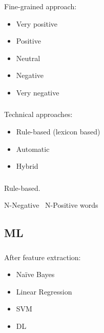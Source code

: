 \documentclass[t, 11pt]{beamer}
\begin{document}
\begin{frame}
	\frametitle{\insertsection}
	\frametitle{\insertsubsection}  
	Fine-grained approach: 
	\begin{itemize}
	\item Very positive
	\item Positive
	\item Neutral
	\item Negative
	\item Very negative
\end{itemize}
\end{frame}



\begin{frame}
	\frametitle{\insertsection}
	\frametitle{\insertsubsection}  
	Technical approaches:
\begin{itemize}
	\item Rule-based (lexicon based)
	\item Automatic
	\item Hybrid
	\end{itemize}
\end{frame}

\begin{frame}
	\frametitle{\insertsection}
	\frametitle{\insertsubsection}  
	Rule-based.
	
	N-Negative \ N-Positive words
	
\end{frame}



\subsection{ML}
\begin{frame}
	\frametitle{\insertsection}
	\frametitle{\insertsubsection}  
	After feature extraction: 
	\begin{itemize}
		\item Naïve Bayes
		\item Linear Regression
		\item SVM  
		\item DL
	\end{itemize}
	 
\end{frame}
\end{document}
